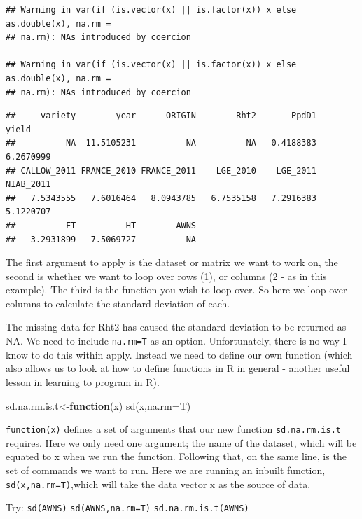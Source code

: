 \documentclass[
]{book}
\newenvironment{Shaded}{\begin{snugshade}}{\end{snugshade}}
\newcommand{\AttributeTok}[1]{\textcolor[rgb]{0.77,0.63,0.00}{#1}}
\newcommand{\ControlFlowTok}[1]{\textcolor[rgb]{0.13,0.29,0.53}{\textbf{#1}}}
\newcommand{\FunctionTok}[1]{\textcolor[rgb]{0.00,0.00,0.00}{#1}}
\newcommand{\NormalTok}[1]{#1}
\newcommand{\OtherTok}[1]{\textcolor[rgb]{0.56,0.35,0.01}{#1}}
\begin{document}
\begin{verbatim}
## Warning in var(if (is.vector(x) || is.factor(x)) x else as.double(x), na.rm =
## na.rm): NAs introduced by coercion

## Warning in var(if (is.vector(x) || is.factor(x)) x else as.double(x), na.rm =
## na.rm): NAs introduced by coercion
\end{verbatim}

\begin{verbatim}
##     variety        year      ORIGIN        Rht2       PpdD1       yield 
##          NA  11.5105231          NA          NA   0.4188383   6.2670999 
## CALLOW_2011 FRANCE_2010 FRANCE_2011    LGE_2010    LGE_2011   NIAB_2011 
##   7.5343555   7.6016464   8.0943785   6.7535158   7.2916383   5.1220707 
##          FT          HT        AWNS 
##   3.2931899   7.5069727          NA
\end{verbatim}

The first argument to apply is the dataset or matrix we want to work on, the second is whether we want to loop over rows (1), or columns (2 - as in this example). The third is the function you wish to loop over. So here we loop over columns to calculate the standard deviation of each.

The missing data for Rht2 has caused the standard deviation to be returned as NA. We need to include \texttt{na.rm=T} as an option. Unfortunately, there is no way I know to do this within apply. Instead we need to define our own function (which also allows us to look at how to define functions in R in general - another useful lesson in learning to program in R).

\begin{Shaded}
\begin{Highlighting}[]
\NormalTok{sd.na.rm.is.t}\OtherTok{\textless{}{-}}\ControlFlowTok{function}\NormalTok{(x) }\FunctionTok{sd}\NormalTok{(x,}\AttributeTok{na.rm=}\NormalTok{T)}
\end{Highlighting}
\end{Shaded}

\texttt{function(x)} defines a set of arguments that our new function \texttt{sd.na.rm.is.t} requires. Here we only need one argument; the name of the dataset, which will be equated to x when we run the function. Following that, on the same line, is the set of commands we want to run. Here we are running an inbuilt function, \texttt{sd(x,na.rm=T)},which will take the data vector x as the source of data.

Try:
\texttt{sd(AWNS)}
\texttt{sd(AWNS,na.rm=T)}
\texttt{sd.na.rm.is.t(AWNS)}
\end{document}
